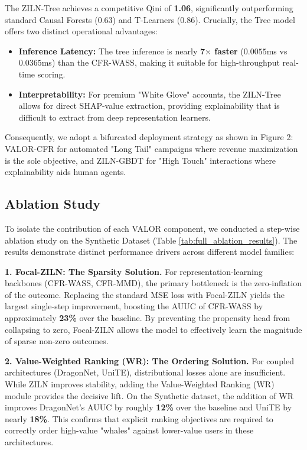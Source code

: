 \documentclass[runningheads]{llncs}
\begin{document}
The ZILN-Tree achieves a competitive Qini of \textbf{1.06}, significantly outperforming standard Causal Forests (0.63) and T-Learners (0.86).
Crucially, the Tree model offers two distinct operational advantages:
\begin{itemize}
    \item \textbf{Inference Latency:} The tree inference is nearly \textbf{7$\times$ faster} ($0.0055$ms vs $0.0365$ms) than the CFR-WASS, making it suitable for high-throughput real-time scoring.
    \item \textbf{Interpretability:} For premium "White Glove" accounts, the ZILN-Tree allows for direct SHAP-value extraction, providing explainability that is difficult to extract from deep representation learners.
\end{itemize}
Consequently, we adopt a bifurcated deployment strategy as shown in Figure 2: VALOR-CFR for automated "Long Tail" campaigns where revenue maximization is the sole objective, and ZILN-GBDT for "High Touch" interactions where explainability aids human agents.

\subsection{Ablation Study }
To isolate the contribution of each VALOR component, we conducted a step-wise ablation study on the Synthetic Dataset (Table \ref{tab:full_ablation_results}). The results demonstrate distinct performance drivers across different model families:

\textbf{1. Focal-ZILN: The Sparsity Solution.}
For representation-learning backbones (CFR-WASS, CFR-MMD), the primary bottleneck is the zero-inflation of the outcome. Replacing the standard MSE loss with Focal-ZILN yields the largest single-step improvement, boosting the AUUC of CFR-WASS by approximately \textbf{23\%} over the baseline. By preventing the propensity head from collapsing to zero, Focal-ZILN allows the model to effectively learn the magnitude of sparse non-zero outcomes.

\textbf{2. Value-Weighted Ranking (WR): The Ordering Solution.}
For coupled architectures (DragonNet, UniTE), distributional losses alone are insufficient. While ZILN improves stability, adding the Value-Weighted Ranking (WR) module provides the decisive lift. On the Synthetic dataset, the addition of WR improves DragonNet's AUUC by roughly \textbf{12\%} over the baseline and UniTE by nearly \textbf{18\%}. This confirms that explicit ranking objectives are required to correctly order high-value "whales" against lower-value users in these architectures.
\end{document}
